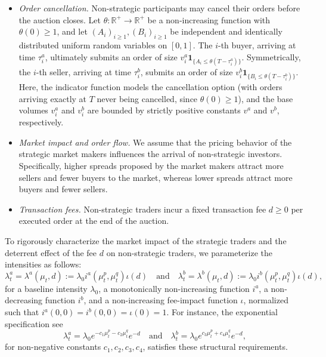 \documentclass[12pt]{article}
\begin{document}
\begin{itemize}
\item \textit{Order cancellation.} Non-strategic participants may cancel their orders before the auction closes. Let $\theta: \mathbb{R}^+ \to \mathbb{R}^+$ be a non-increasing function with $\theta(0) \geq 1$, and let $(A_i)_{i \geq 1}, (B_i)_{i \geq 1}$ be independent and identically distributed uniform random variables on $[0,1]$. The $i$-th buyer, arriving at time $\tau_i^a$, ultimately submits an order of size $v_i^a \mathbf{1}_{\{A_i \leq \theta(T - \tau^a_i)\}}$. Symmetrically, the $i$-th seller, arriving at time $\tau_i^b$, submits an order of size $v_i^b \mathbf{1}_{\{B_i \leq \theta(T - \tau^b_i)\}}$. Here, the indicator function models the cancellation option (with orders arriving exactly at $T$ never being cancelled, since $\theta(0) \geq 1$), and the base volumes $v^a_i$ and $v^b_i$ are bounded by strictly positive constants $v^a$ and $v^b$, respectively. 

\item \textit{Market impact and order flow.} We assume that the pricing behavior of the strategic market makers influences the arrival of non-strategic investors. Specifically, higher spreads proposed by the market makers attract more sellers and fewer buyers to the market, whereas lower spreads attract more buyers and fewer sellers. 

\item \textit{Transaction fees.} Non-strategic traders incur a fixed transaction fee $d \geq 0$ per executed order at the end of the auction.
\end{itemize}

To rigorously characterize the market impact of the strategic traders and the deterrent effect of the fee $d$ on non-strategic traders, we parameterize the intensities as follows:
$$ \lambda^a_t = \lambda^a(\mu_t,d) := \lambda_0 i^a(\mu^p_t,\mu^q_t)\iota(d) \quad \text{and} \quad \lambda^b_t = \lambda^b(\mu_t,d) := \lambda_0 i^b(\mu^p_t,\mu^q_t)\iota(d), $$
for a baseline intensity $\lambda_0$, a monotonically non-increasing function $i^a$, a non-decreasing function $i^b$, and a non-increasing fee-impact function $\iota$, normalized such that $i^a(0,0) = i^b(0,0) = \iota(0) = 1$. For instance, the exponential specification see \cite[Section 2.5.]{avellaneda2008high}
$$ \lambda^a_t = \lambda_0 e^{-c_1\mu^p_t - c_2\mu^q_t} e^{-d} \quad \text{and} \quad \lambda^b_t = \lambda_0 e^{c_3\mu^p_t + c_4 \mu^q_t}e^{-d}, $$
for non-negative constants $c_1, c_2, c_3, c_4$, satisfies these structural requirements. \vspace{0.5em}
 
\end{document}
